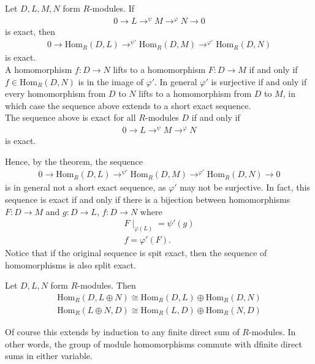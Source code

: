 \documentclass{memoir}
\begin{document}
\begin{thm}
	Let \(D,L,M,N\) form \(R\)-modules. If
	\begin{align*}
		0 \to L \to^{\psi }M \to^{\varphi }N \to 0
	\end{align*}
	is exact, then
	\begin{align*}
		0 \to \textrm{Hom}_R(D,L) \to^{\psi '} \textrm{Hom}_R(D,M) \to^{\varphi '} \textrm{Hom}_R(D,N)
	\end{align*}
	is exact.\\

	A homomorphism \(f:D\to N\) lifts to a homomorphism \(F:D\to M\) if and only if \(f \in \textrm{Hom}_R(D,N)\) is in the image of \(\varphi '\). In general \(\varphi '\) is surjective if and only if every homomorphism from \(D\) to \(N\) lifts to a homomorphism from \(D\) to \(M\), in which case the sequence above extends to a short exact sequence.\\

	The sequence above is exact for all \(R\)-modules \(D\) if and only if
	\begin{align*}
		0 \to L \to^{\psi }M \to^{\varphi }N
	\end{align*}
	is exact.
\end{thm}
Hence, by the theorem, the sequence
\begin{align*}
	0 \to \textrm{Hom}_R(D,L) \to^{\psi '}\textrm{Hom}_R(D,M) \to^{\varphi '} \textrm{Hom}_R(D,N) \to 0
\end{align*}
is in general not a short exact sequence, as \(\varphi '\) may not be surjective. In fact, this sequence is exact if and only if there is a bijection between homomorphisms \(F:D \to M\) and \(g:D\to L\), \(f:D\to N\) where
\begin{align*}
	F\mid_{\varphi (L)} = \psi'(g)\\
	f = \varphi'(F).
\end{align*}
Notice that if the original sequence is spit exact, then the sequence of homomorphisms is also split exact.
\begin{prop}
	Let \(D,L,N\) form \(R\)-modules. Then
	\begin{align*}
		\textrm{Hom}_R(D,L\oplus N) \cong \textrm{Hom}_R(D,L) \oplus \textrm{Hom}_R(D,N)\\
		\textrm{Hom}_R(L \oplus N, D) \cong \textrm{Hom}_R(L,D) \oplus \textrm{Hom}_R(N,D)
	\end{align*}
\end{prop}
Of course this extends by induction to any finite direct sum of \(R\)-modules. In other words, the group of module homomorphisms commute with dfinite direct sums in either variable.
\end{document}
